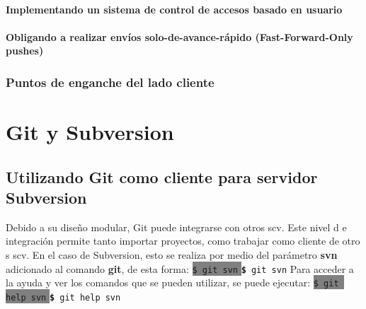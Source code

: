 \documentclass[12pt, spanish, oneside, onecolumn, a4paper]{report}
\newcommand{\shellcmd}[1]{ %
  \colorbox{Gray}{
    \indent\indent\texttt{\footnotesize\$ #1}
  }
  \colorbox{mygray}{
    \indent\indent\texttt{\textbf{\footnotesize\$} #1}
  }
}
\begin{document}
\subsubsection{Implementando un sistema de control de accesos basado en usuario} 
\label{sec:userbasedaccesscontrol} 
\subsubsection{Obligando a realizar envíos solo-de-avance-rápido (Fast-Forward-Only pushes)} 
\label{sec:onlyfastforward} 
\subsection{Puntos de enganche del lado cliente} 
\label{sec:clienthook}


\chapter{Git y Subversion} 
\label{chap:gitsvn} 
\section{Utilizando Git como cliente para servidor Subversion} 
\label{sec:gitclientsvn} Debido a su diseño modular, Git puede integrarse con otros 
\gls{scv}. Este nivel d e integración permite tanto importar proyectos, como trabajar como cliente de otro s 
\gls{scv}. En el caso de Subversion, esto se realiza por medio del parámetro 
\textbf{svn} adicionado al comando 
\textbf{git}, de esta forma: 
\shellcmd{git svn} Para acceder a la ayuda y ver los comandos que se pueden utilizar, se puede ejecutar: 
\shellcmd{git help svn} 
\end{document}
